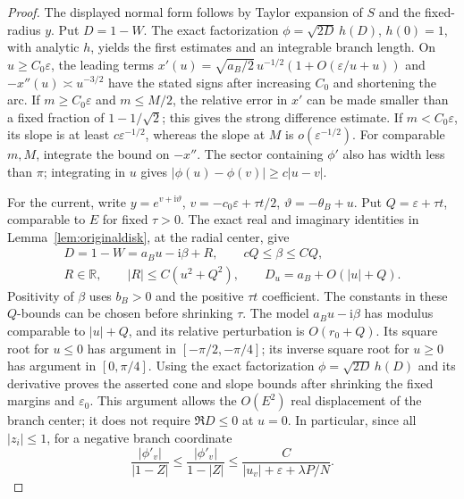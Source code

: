 \documentclass[11pt]{article}
\numberwithin{equation}{section}
\theoremstyle{definition}
\newcommand{\ii}{\mathrm i}
\newcommand{\R}{\mathbb R}
\newcommand{\eps}{\varepsilon}
\begin{document}
\begin{proof}
The displayed normal form follows by Taylor expansion of \(S\) and
the fixed-radius \(y\). Put \(D=1-W\).
The exact factorization \(\phi=\sqrt{2D}\,h(D)\), \(h(0)=1\),
with analytic \(h\), yields the first estimates and an integrable
branch length. On \(u\ge C_0\eps\), the leading terms
\(x'(u)=\sqrt{a_B/2}\,u^{-1/2}(1+O(\eps/u+u))\) and
\(-x''(u)\asymp u^{-3/2}\) have the stated signs after increasing
\(C_0\) and shortening the arc.
If \(m\ge C_0\eps\) and \(m\le M/2\), the relative error in
\(x'\) can be made smaller than a fixed fraction of
\(1-1/\sqrt2\); this gives the strong difference estimate.
If \(m<C_0\eps\), its slope is at least \(c\eps^{-1/2}\),
whereas the slope at \(M\) is \(o(\eps^{-1/2})\).
For comparable \(m,M\), integrate the bound on \(-x''\).
The sector containing \(\phi'\) also has width less than \(\pi\);
integrating in \(u\) gives
\(|\phi(u)-\phi(v)|\ge c|u-v|\).

For the current, write \(y=e^{v+\ii\vartheta}\),
\(v=-c_0\eps+\tau t/2\), \(\vartheta=-\theta_B+u\).
Put \(Q=\eps+\tau t\), comparable to \(E\) for fixed \(\tau>0\).
The exact real and imaginary identities in
Lemma~\ref{lem:originaldisk}, at the radial center, give
\begin{gather*}
 D=1-W=a_Bu-\ii\beta+R,\qquad cQ\le\beta\le CQ,\\
 R\in\R,\qquad |R|\le C(u^2+Q^2),\qquad
 D_u=a_B+O(|u|+Q).
\end{gather*}
Positivity of \(\beta\) uses \(b_B>0\) and the positive
\(\tau t\) coefficient. The constants in these \(Q\)-bounds
can be chosen before shrinking \(\tau\). The model
\(a_Bu-\ii\beta\) has modulus comparable to \(|u|+Q\), and
its relative perturbation is \(O(r_0+Q)\). Its square root for \(u\le0\) has argument
in \([-\pi/2,-\pi/4]\); its inverse square root for \(u\ge0\)
has argument in \([0,\pi/4]\). Using the exact factorization
\(\phi=\sqrt{2D}\,h(D)\) and its derivative proves the asserted
cone and slope bounds after shrinking the fixed margins and
\(\eps_0\). This argument allows the \(O(E^2)\) real displacement
of the branch center; it does not require \(\Re D\le0\) at \(u=0\).
In particular, since all \(|z_i|\le1\), for a negative branch
coordinate
\[
 \frac{|\phi'_v|}{|1-Z|}
 \le\frac{|\phi'_v|}{1-|Z|}
 \le\frac C{|u_v|+\eps+\lambda P/N}.
\]
\end{proof}
\end{document}
